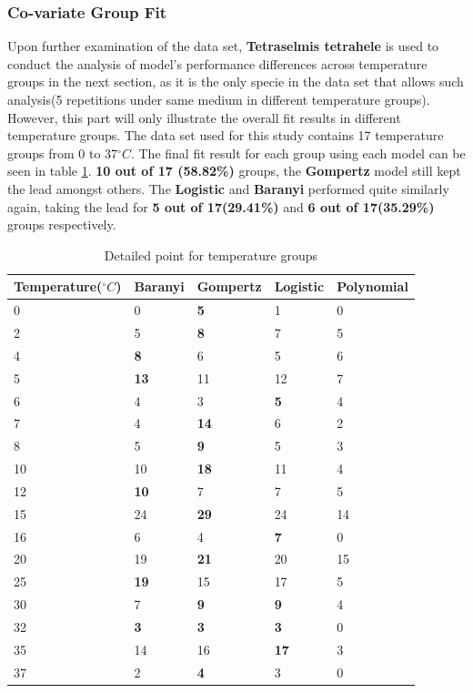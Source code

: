 \documentclass[11pt]{article}
\begin{document}
\subsubsection{ Co-variate Group Fit}
Upon further examination of the data set, \textbf{Tetraselmis tetrahele} is used to conduct the analysis of model's performance differences across temperature groups in the next section, as it is the only specie in the data set that allows such analysis(5 repetitions under same medium in different temperature groups). However, this part will only illustrate  the overall fit results in different temperature groups. The data set used for this study contains 17 temperature groups from 0 to 37$^\circ C$. The final fit result for each group using each model can be seen in table \ref{tab: tempfit}. \textbf{10 out of 17 (58.82\%)} groups, the \textbf{Gompertz} model still kept the lead amongst others. The \textbf{Logistic} and \textbf{Baranyi} performed quite similarly again, taking the lead for \textbf{5 out of 17(29.41\%)} and \textbf{6 out of 17(35.29\%)} groups respectively. 
\begin{table}[!htbp]
\begin{tabularx}{\linewidth}{X X X X X}
\toprule  Temperature($^\circ C$) & Baranyi & Gompertz & Logistic & Polynomial \\
\midrule
0 & 0 & \textbf{5} & 1 & 0  \\
2 & 5 & \textbf{8} & 7 & 5  \\
4 & \textbf{8} & 6 & 5 & 6  \\
5 & \textbf{13} & 11 & 12 & 7  \\
6 & 4 & 3 & \textbf{5} & 4  \\
7 & 4 & \textbf{14} & 6 & 2   \\
8 & 5 & \textbf{9} & 5 & 3  \\
10 & 10 & \textbf{18} & 11 & 4  \\
12 & \textbf{10} & 7 & 7 & 5  \\
15 & 24 & \textbf{29} & 24 & 14  \\
16 & 6 & 4 & \textbf{7} & 0  \\
20 & 19 & \textbf{21} & 20 & 15  \\
25 & \textbf{19} & 15 & 17 & 5  \\
30 & 7 & \textbf{9} & \textbf{9} & 4  \\
32 & \textbf{3} & \textbf{3} & \textbf{3} & 0  \\
35 & 14 & 16 & \textbf{17} & 3  \\
37 & 2 & \textbf{4} & 3 & 0  \\
\bottomrule
\end{tabularx}
\caption{Detailed point for temperature groups}
\label{tab: tempfit}
\end{table}          
\FloatBarrier
\end{document}
